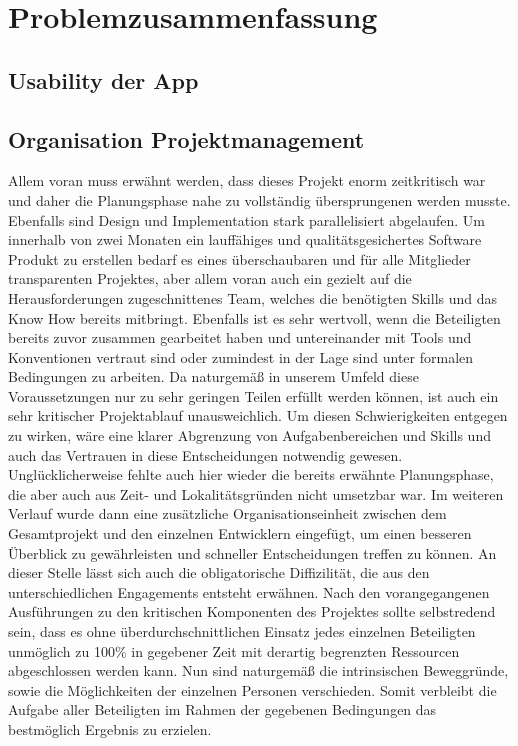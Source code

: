 \documentclass[12pt,a4paper]{article}
\begin{document}
\section{Problemzusammenfassung}
\subsection{Usability der App}
\newpage
\subsection{Organisation Projektmanagement}
Allem voran muss erwähnt werden, dass dieses Projekt enorm zeitkritisch war und daher die Planungsphase nahe zu vollständig übersprungenen werden musste. Ebenfalls sind Design und Implementation stark parallelisiert abgelaufen. Um innerhalb von zwei Monaten ein lauffähiges und qualitätsgesichertes Software Produkt zu erstellen bedarf es eines überschaubaren und für alle Mitglieder transparenten Projektes, aber allem voran auch ein gezielt auf die Herausforderungen zugeschnittenes Team, welches die benötigten Skills und das Know How bereits mitbringt. Ebenfalls ist es sehr wertvoll, wenn die Beteiligten bereits zuvor zusammen gearbeitet haben und untereinander mit Tools und Konventionen vertraut sind oder zumindest in der Lage sind unter formalen Bedingungen zu arbeiten. Da naturgemäß in unserem Umfeld diese Voraussetzungen nur zu sehr geringen Teilen erfüllt werden können, ist auch ein sehr kritischer Projektablauf unausweichlich. Um diesen Schwierigkeiten entgegen zu wirken, wäre eine klarer Abgrenzung von Aufgabenbereichen
und Skills und auch das Vertrauen in diese Entscheidungen notwendig
gewesen. Unglücklicherweise fehlte auch hier wieder die bereits erwähnte Planungsphase, die aber auch aus Zeit- und Lokalitätsgründen nicht umsetzbar war. Im weiteren Verlauf wurde dann eine zusätzliche
Organisationseinheit zwischen dem Gesamtprojekt und den einzelnen
Entwicklern eingefügt, um einen besseren Überblick zu gewährleisten und schneller Entscheidungen treffen zu können. An dieser Stelle lässt sich auch die obligatorische Diffizilität, die aus den unterschiedlichen Engagements entsteht erwähnen. Nach den vorangegangenen Ausführungen zu den kritischen Komponenten des Projektes sollte selbstredend sein, dass es ohne überdurchschnittlichen Einsatz jedes einzelnen Beteiligten
unmöglich zu 100\% in gegebener Zeit mit derartig begrenzten Ressourcen abgeschlossen werden kann. Nun sind naturgemäß die intrinsischen Beweggründe, sowie die Möglichkeiten der einzelnen Personen verschieden. Somit verbleibt die Aufgabe aller Beteiligten im Rahmen der gegebenen
Bedingungen das bestmöglich Ergebnis zu erzielen.
\newpage
\end{document}

